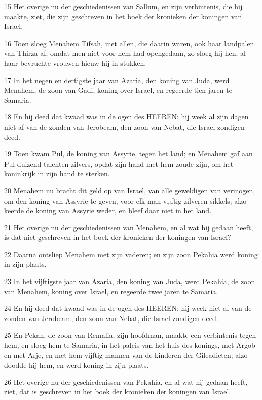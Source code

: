 \par 15 Het overige nu der geschiedenissen van Sallum, en zijn verbintenis, die hij maakte, ziet, die zijn geschreven in het boek der kronieken der koningen van Israel.
\par 16 Toen sloeg Menahem Tifsah, met allen, die daarin waren, ook haar landpalen van Thirza af; omdat men niet voor hem had opengedaan, zo sloeg hij hen; al haar bevruchte vrouwen hieuw hij in stukken.
\par 17 In het negen en dertigste jaar van Azaria, den koning van Juda, werd Menahem, de zoon van Gadi, koning over Israel, en regeerde tien jaren te Samaria.
\par 18 En hij deed dat kwaad was in de ogen des HEEREN; hij week al zijn dagen niet af van de zonden van Jerobeam, den zoon van Nebat, die Israel zondigen deed.
\par 19 Toen kwam Pul, de koning van Assyrie, tegen het land; en Menahem gaf aan Pul duizend talenten zilvers, opdat zijn hand met hem zoude zijn, om het koninkrijk in zijn hand te sterken.
\par 20 Menahem nu bracht dit geld op van Israel, van alle geweldigen van vermogen, om den koning van Assyrie te geven, voor elk man vijftig zilveren sikkels; alzo keerde de koning van Assyrie weder, en bleef daar niet in het land.
\par 21 Het overige nu der geschiedenissen van Menahem, en al wat hij gedaan heeft, is dat niet geschreven in het boek der kronieken der koningen van Israel?
\par 22 Daarna ontsliep Menahem met zijn vaderen; en zijn zoon Pekahia werd koning in zijn plaats.
\par 23 In het vijftigste jaar van Azaria, den koning van Juda, werd Pekahia, de zoon van Menahem, koning over Israel, en regeerde twee jaren te Samaria.
\par 24 En hij deed dat kwaad was in de ogen des HEEREN; hij week niet af van de zonden van Jerobeam, den zoon van Nebat, die Israel zondigen deed.
\par 25 En Pekah, de zoon van Remalia, zijn hoofdman, maakte een verbintenis tegen hem, en sloeg hem te Samaria, in het paleis van het huis des konings, met Argob en met Arje, en met hem vijftig mannen van de kinderen der Gileadieten; alzo doodde hij hem, en werd koning in zijn plaats.
\par 26 Het overige nu der geschiedenissen van Pekahia, en al wat hij gedaan heeft, ziet, dat is geschreven in het boek der kronieken der koningen van Israel.
